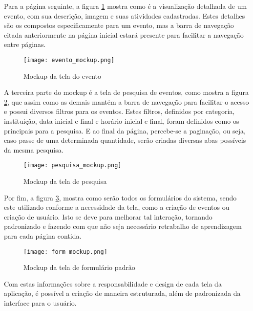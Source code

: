 Para a página seguinte, a figura \ref{evento_mockup} mostra como é a visualização detalhada de um evento, com sua descrição, imagem e suas atividades cadastradas. Estes detalhes são os compostos especificamente para um evento, mas a barra de navegação citada anteriormente na página inicial estará presente para facilitar a navegação entre páginas.
\begin{figure}[h]
    \caption{\label{evento_mockup}Mockup da tela do evento}
    \vspace{5pt}
    \centering
    \texttt{[image: evento\_mockup.png]}
    \vspace{5pt}
\end{figure}

A terceira parte do mockup é a tela de pesquisa de eventos, como mostra a figura \ref{pesquisa_mockup}, que assim como as demais mantém a barra de navegação para facilitar o acesso e possui diversos filtros para os eventos. Estes filtros, definidos por categoria, instituição, data inicial e final e horário inicial e final, foram definidos como os principais para a pesquisa. E ao final da página, percebe-se a paginação, ou seja, caso passe de uma determinada quantidade, serão criadas diversas abas possíveis da mesma pesquisa.
\begin{figure}[H]
    \caption{\label{pesquisa_mockup}Mockup da tela de pesquisa}
    \vspace{5pt}
    \centering
    \texttt{[image: pesquisa\_mockup.png]}
    \vspace{5pt}
\end{figure}

Por fim, a figura \ref{form_mockup}, mostra como serão todos os formulários do sistema, sendo este utilizado conforme a necessidade da tela, como a criação de eventos ou criação de usuário. Isto se deve para melhorar tal interação, tornando padronizado e fazendo com que não seja necessário retrabalho de aprendizagem para cada página contida.
\begin{figure}[H]
    \caption{\label{form_mockup}Mockup da tela de formulário padrão}
    \vspace{5pt}
    \centering
    \texttt{[image: form\_mockup.png]}
    \vspace{5pt}
\end{figure}

Com estas informações sobre a responsabilidade e design de cada tela da aplicação, é possível a criação de maneira estruturada, além de padronizada da interface para o usuário. 

